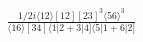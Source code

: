 \documentclass[varwidth, border=5pt]{standalone}
\begin{document}
\begin{my}
$\begin{gathered}
\scriptscriptstyle\frac{1/2i\langle12\rangle[12][23]^3\langle56\rangle^3}{\langle16\rangle[34]\langle1|2+3|4]\langle5|1+6|2]}
\end{gathered}$
\end{my}
\end{document}
